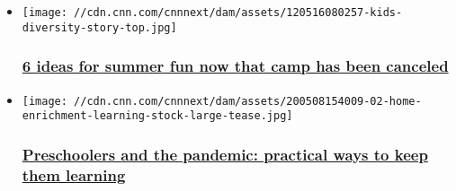 \begin{itemize}
\item
  \href{/2020/05/20/health/summer-camp-fun-alternatives-wellness/index.html}{}

  \texttt{[image: //cdn.cnn.com/cnnnext/dam/assets/120516080257-kids-diversity-story-top.jpg]}

  \hypertarget{6-ideas-for-summer-fun-now-that-camp-has-been-canceled}{%
  \subsubsection{\texorpdfstring{\href{/2020/05/20/health/summer-camp-fun-alternatives-wellness/index.html}{6
  ideas for summer fun now that camp has been
  canceled}}{6 ideas for summer fun now that camp has been canceled}}\label{6-ideas-for-summer-fun-now-that-camp-has-been-canceled}}
\item
  \href{/2020/05/17/health/preschool-homeschooling-parenting-pandemic-wellness/index.html}{}

  \texttt{[image: //cdn.cnn.com/cnnnext/dam/assets/200508154009-02-home-enrichment-learning-stock-large-tease.jpg]}

  \hypertarget{preschoolers-and-the-pandemic-practical-ways-to-keep-them-learning}{%
  \subsubsection{\texorpdfstring{\href{/2020/05/17/health/preschool-homeschooling-parenting-pandemic-wellness/index.html}{Preschoolers
  and the pandemic: practical ways to keep them
  learning}}{Preschoolers and the pandemic: practical ways to keep them learning}}\label{preschoolers-and-the-pandemic-practical-ways-to-keep-them-learning}}
\end{itemize}

